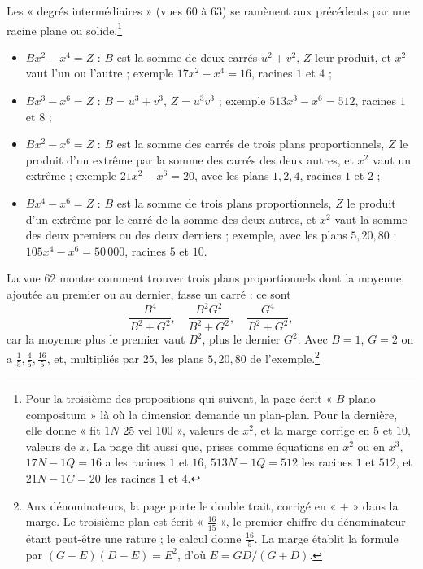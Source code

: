 \documentclass[11pt,a4paper]{article}
\begin{document}
Les « degrés intermédiaires » (vues 60 à 63) se ramènent aux précédents par une
racine plane ou solide.\footnote{Pour la troisième des propositions qui suivent, la
page écrit « $B$ plano compositum » là où la dimension demande un plan-plan. Pour
la dernière, elle donne « fit $1N$ 25 vel 100 », valeurs de $x^2$, et la marge
corrige en $5$ et $10$, valeurs de $x$. La page dit aussi que, prises comme
équations en $x^2$ ou en $x^3$, $17N - 1Q = 16$ a les racines $1$ et $16$,
$513N - 1Q = 512$ les racines $1$ et $512$, et $21N - 1C = 20$ les racines $1$ et
$4$.}
\begin{itemize}
  \item $Bx^2 - x^4 = Z$ : $B$ est la somme de deux carrés $u^2 + v^2$, $Z$ leur
    produit, et $x^2$ vaut l'un ou l'autre ; exemple $17x^2 - x^4 = 16$, racines $1$
    et $4$ ;
  \item $Bx^3 - x^6 = Z$ : $B = u^3 + v^3$, $Z = u^3v^3$ ; exemple
    $513x^3 - x^6 = 512$, racines $1$ et $8$ ;
  \item $Bx^2 - x^6 = Z$ : $B$ est la somme des carrés de trois plans
    proportionnels, $Z$ le produit d'un extrême par la somme des carrés des deux
    autres, et $x^2$ vaut un extrême ; exemple $21x^2 - x^6 = 20$, avec les plans
    $1, 2, 4$, racines $1$ et $2$ ;
  \item $Bx^4 - x^6 = Z$ : $B$ est la somme de trois plans proportionnels, $Z$ le
    produit d'un extrême par le carré de la somme des deux autres, et $x^2$ vaut
    la somme des deux premiers ou des deux derniers ; exemple, avec les plans
    $5, 20, 80$ : $105x^4 - x^6 = 50\,000$, racines $5$ et $10$.
\end{itemize}
La vue 62 montre comment trouver trois plans proportionnels
dont la moyenne, ajoutée au premier ou au dernier, fasse un carré : ce sont
\[ \frac{B^4}{B^2 + G^2}, \quad \frac{B^2G^2}{B^2 + G^2}, \quad
   \frac{G^4}{B^2 + G^2} , \]
car la moyenne plus le premier vaut $B^2$, plus le dernier $G^2$. Avec $B = 1$,
$G = 2$ on a $\tfrac15, \tfrac45, \tfrac{16}{5}$, et, multipliés par $25$, les
plans $5, 20, 80$ de l'exemple.\footnote{Aux dénominateurs, la page porte le double
trait, corrigé en « $+$ » dans la marge. Le troisième plan est écrit
« $\frac{16}{15}$ », le premier chiffre du dénominateur étant peut-être une rature ;
le calcul donne $\frac{16}{5}$. La marge établit la formule par
$(G - E)(D - E) = E^2$, d'où $E = GD/(G + D)$.}
\end{document}
